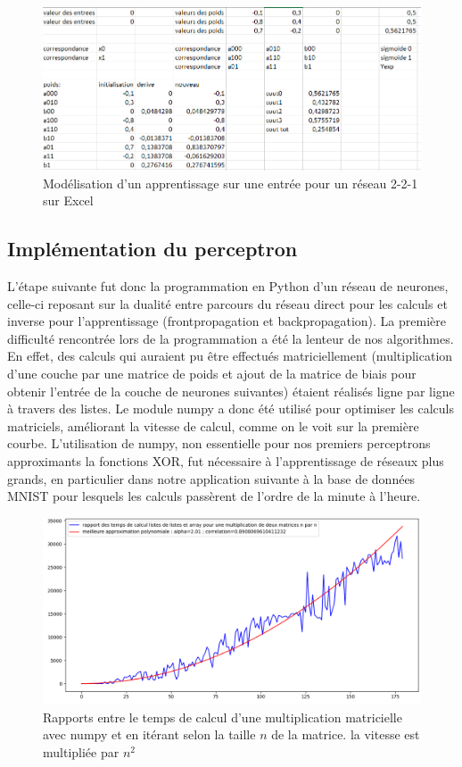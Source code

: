 \documentclass[
    10pt,
    a4paper,
    oneside,
    headinclude,footinclude,
    BCOR=5mm,
    captions=tableabove
]{scrartcl}
\begin{document}
\begin{figure}[!h]
\includegraphics[width=\linewidth]{excelXOR.png}
\centering
\caption{Modélisation d'un apprentissage sur une entrée pour un réseau 2-2-1 sur Excel}
\label{fig:excelXOR}
\end{figure}

\subsection{Implémentation du perceptron}
L'étape suivante fut donc la programmation en Python d'un réseau de neurones, celle-ci reposant sur la dualité entre parcours du réseau direct pour les calculs et inverse pour l'apprentissage (frontpropagation et backpropagation). La première difficulté rencontrée lors de la programmation a été la lenteur de nos algorithmes. En effet, des calculs qui auraient pu être effectués matriciellement (multiplication d'une couche par une matrice de poids et ajout de la matrice de biais pour obtenir l'entrée de la couche de neurones suivantes) étaient réalisés ligne par ligne à travers des listes. Le module numpy a donc été utilisé pour optimiser les calculs matriciels, améliorant la vitesse de calcul, comme on le voit sur la première courbe. L'utilisation de numpy, non essentielle pour nos premiers perceptrons approximants la fonctions XOR, fut nécessaire à l'apprentissage de réseaux plus grands, en particulier dans notre application suivante à la base de données MNIST pour lesquels les calculs passèrent de l'ordre de la minute à l'heure.

\begin{figure}[h!]
\includegraphics[width=\linewidth]{tpsCalcul.png}
\centering
\caption{Rapports entre le temps de calcul d'une multiplication matricielle avec numpy et en itérant selon la taille $n$ de la matrice. la vitesse est multipliée par  $n^{2}$ }
\label{fig:tpsCalcul}
\end{figure}
\end{document}

